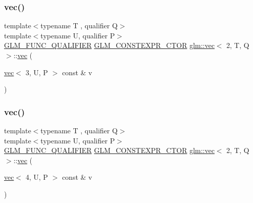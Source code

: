 \mbox{\label{structglm_1_1vec_3_012_00_01_t_00_01_q_01_4_ac6f3c81265603dd5c06c75776911aff4}} 
\subsubsection{\texorpdfstring{vec()}{vec()}\hspace{0.1cm}{\footnotesize\ttfamily [16/17]}}
{\footnotesize\ttfamily template$<$typename T , qualifier Q$>$ \\
template$<$typename U, qualifier P$>$ \\
\mbox{\hyperlink{setup_8hpp_a33fdea6f91c5f834105f7415e2a64407}{G\+L\+M\+\_\+\+F\+U\+N\+C\+\_\+\+Q\+U\+A\+L\+I\+F\+I\+ER}} \mbox{\hyperlink{setup_8hpp_ad34178a09666081abdb573c14d1f4a5a}{G\+L\+M\+\_\+\+C\+O\+N\+S\+T\+E\+X\+P\+R\+\_\+\+C\+T\+OR}} \mbox{\hyperlink{structglm_1_1vec}{glm\+::vec}}$<$ 2, T, Q $>$\+::\mbox{\hyperlink{structglm_1_1vec}{vec}} (\begin{DoxyParamCaption}\item[{\mbox{\hyperlink{structglm_1_1vec}{vec}}$<$ 3, U, P $>$ const \&}]{v }\end{DoxyParamCaption})}

\mbox{\label{structglm_1_1vec_3_012_00_01_t_00_01_q_01_4_a369d48c9ccf09e6ef21f17178abf9f81}} 
\subsubsection{\texorpdfstring{vec()}{vec()}\hspace{0.1cm}{\footnotesize\ttfamily [17/17]}}
{\footnotesize\ttfamily template$<$typename T , qualifier Q$>$ \\
template$<$typename U, qualifier P$>$ \\
\mbox{\hyperlink{setup_8hpp_a33fdea6f91c5f834105f7415e2a64407}{G\+L\+M\+\_\+\+F\+U\+N\+C\+\_\+\+Q\+U\+A\+L\+I\+F\+I\+ER}} \mbox{\hyperlink{setup_8hpp_ad34178a09666081abdb573c14d1f4a5a}{G\+L\+M\+\_\+\+C\+O\+N\+S\+T\+E\+X\+P\+R\+\_\+\+C\+T\+OR}} \mbox{\hyperlink{structglm_1_1vec}{glm\+::vec}}$<$ 2, T, Q $>$\+::\mbox{\hyperlink{structglm_1_1vec}{vec}} (\begin{DoxyParamCaption}\item[{\mbox{\hyperlink{structglm_1_1vec}{vec}}$<$ 4, U, P $>$ const \&}]{v }\end{DoxyParamCaption})}



